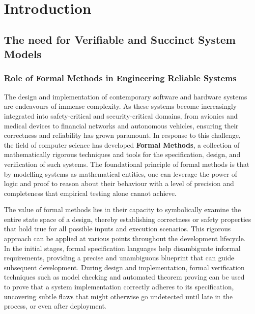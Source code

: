 \chapter{Introduction}

\section{The need for Verifiable and Succinct System Models}

\subsection*{Role of Formal Methods in Engineering Reliable Systems}
The design and implementation of contemporary software and hardware systems are endeavours of immense complexity. As these systems become increasingly integrated into safety-critical and security-critical domains, from avionics and medical devices to financial networks and autonomous vehicles, ensuring their correctness and reliability has grown paramount. In response to this challenge, the field of computer science has developed \textbf{Formal Methods}, a collection of mathematically rigorous techniques and tools for the specification, design, and verification of such systems. The foundational principle of formal methods is that by modelling systems as mathematical entities, one can leverage the power of logic and proof to reason about their behaviour with a level of precision and completeness that empirical testing alone cannot achieve.

The value of formal methods lies in their capacity to symbolically examine the entire state space of a design, thereby establishing correctness or safety properties that hold true for all possible inputs and execution scenarios. This rigorous approach can be applied at various points throughout the development lifecycle. In the initial stages, formal specification languages help disambiguate informal requirements, providing a precise and unambiguous blueprint that can guide subsequent development. During design and implementation, formal verification techniques such as model checking and automated theorem proving can be used to prove that a system implementation correctly adheres to its specification, uncovering subtle flaws that might otherwise go undetected until late in the process, or even after deployment.

